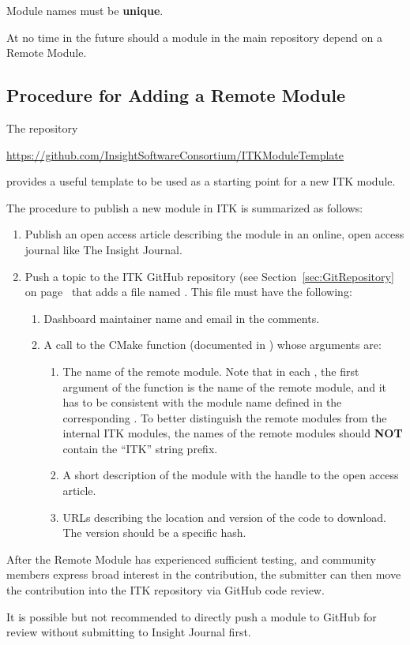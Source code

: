 Module names must be \textbf{unique}.

At no time in the future should a module in the main repository depend on a
Remote Module.

\subsection{Procedure for Adding a Remote Module}
\label{subsec:ProcedureAddingRemoteModules}

The repository
\begin{center}
  \url{https://github.com/InsightSoftwareConsortium/ITKModuleTemplate}
\end{center}

provides a useful template to be used as a starting point for a new ITK module.

The procedure to publish a new module in ITK is summarized as follows:
\begin{enumerate}
\item Publish an open access article describing the module in an online, open
  access journal like The Insight Journal.
\item Push a topic to the ITK GitHub repository (see
  Section~\ref{sec:GitRepository} on page~\pageref{sec:GitRepository} that
  adds a file named
  . This file must have the
  following:
  \begin{enumerate}
    \item Dashboard maintainer name and email in the comments.
    \item A call to the  CMake function (documented in
      ) whose arguments are:
      \begin{enumerate}
      \item The name of the remote module. Note that in each
        , the first argument of the function
         is the name of the remote module, and it has to be
        consistent with the module name defined in the corresponding
        . To better distinguish the remote
        modules from the internal ITK modules, the names of the remote modules should
        \textbf{NOT} contain the ``ITK'' string prefix.
      \item A short description of the module with the handle to the open access
        article.
      \item URLs describing the location and version of the code to download. The
        version should be a specific hash.
      \end{enumerate}
  \end{enumerate}
\end{enumerate}

After the Remote Module has experienced sufficient testing, and community
members express broad interest in the contribution, the submitter can then move
the contribution into the ITK repository via GitHub code review.

It is possible but not recommended to directly push a module to GitHub for
review without submitting to Insight Journal first.
